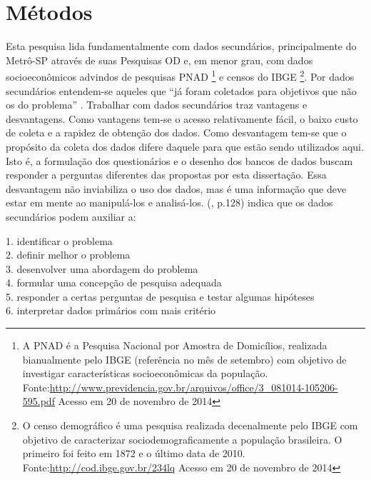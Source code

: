 \chapter{Métodos}\label{chap:metodo}


Esta pesquisa lida fundamentalmente com dados secundários, principalmente do Metrô-SP através de suas Pesquisas OD e, em menor grau, com dados socioeconômicos advindos de pesquisas PNAD
\footnote{A PNAD é a Pesquisa Nacional por Amostra de Domicílios, realizada bianualmente pelo IBGE (referência no mês de setembro) com objetivo de investigar características socioeconômicas da população. Fonte:\url{http://www.previdencia.gov.br/arquivos/office/3_081014-105206-595.pdf} Acesso em 20 de novembro de 2014} e censos do IBGE
\footnote{O censo demográfico é uma pesquisa realizada decenalmente pelo IBGE com objetivo de caracterizar sociodemograficamente a população brasileira. O primeiro foi feito em 1872 e o último data de 2010. Fonte:\url{http://cod.ibge.gov.br/234lq} Acesso em 20 de novembro de 2014}.
Por dados secundários entendem-se aqueles que ``já foram coletados para objetivos que não os do problema'' \cite[p.127]{MALHORTA2001}. Trabalhar com dados secundários traz vantagens e desvantagens. Como vantagens tem-se o acesso relativamente fácil, o baixo custo de coleta e a rapidez de obtenção dos dados. Como desvantagem tem-se que o propósito da coleta dos dados difere daquele para que estão sendo utilizados aqui. Isto é, a formulação dos questionários e o desenho dos bancos de dados buscam responder a perguntas diferentes das propostas por esta dissertação.
Essa desvantagem não inviabiliza o uso dos dados, mas é uma informação que deve estar em mente ao manipulá-los e analisá-los.  (\citeyear{MALHORTA2001}, p.128) indica que os dados secundários podem auxiliar a:

\begin{citacao}
	1. identificar o problema\\
	2. definir melhor o problema\\
	3. desenvolver uma abordagem do problema\\
	4. formular uma concepção de pesquisa adequada\\
	5. responder a certas perguntas de pesquisa e testar algumas hipóteses\\
	6. interpretar dados primários com mais critério
\end{citacao}

